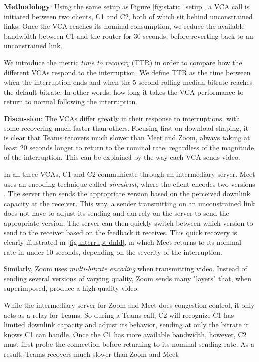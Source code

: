\noindent \textbf{Methodology}:
Using the same setup as Figure \ref{fig:static_setup}, a VCA call is initiated between two clients, C1 and C2, both of which sit behind unconstrained links. Once the VCA reaches its nominal consumption, we reduce the available bandwidth between C1 and the router for 30 seconds, before reverting back to an unconstrained link.  

We introduce the metric \textit{time to recovery} (TTR) in order to compare how the different VCAs respond to the interruption. We define TTR as the time 
between when the interruption ends and when the 5 second rolling median bitrate reaches the default bitrate. In other words, how long it takes the VCA performance to return to normal following the interruption.

\noindent \textbf{Discussion}: 
The VCAs differ greatly in their response to interruptions, with some recovering much faster than others. Focusing first on download shaping, it is clear that Teams recovers much slower than Meet and Zoom, always taking at least 20 seconds longer to return to the nominal rate, regardless of the magnitude of the interruption. This can be explained by the way each VCA sends video. 

In all three VCAs, C1 and C2 communicate through an intermediary server. Meet uses an encoding technique called \textit{simulcast}, where the client encodes two versions . The server then sends the appropriate version based on the perceived downlink capacity at the receiver. This way, a sender transmitting on an unconstrained link does not have to adjust its sending and can rely on the server to send the appropriate version. The server can then quickly switch between which version to send to the receiver based on the feedback it receives. This quick recovery is clearly illustrated in \ref{fig:interrupt-dnld}, in which Meet returns to its nominal rate in under 10 seconds, depending on the severity of the interruption.

Similarly, Zoom uses \textit{multi-bitrate encoding} when transmitting video. Instead of sending several versions of varying quality, Zoom sends many "layers" that, when superimposed, produce a high quality video. 

While the intermediary server for Zoom and Meet does congestion control, it only acts as a relay for Teams. So during a Teams call, C2 will recognize C1 has limited downlink capacity and adjust its behavior, sending at only the bitrate it knows C1 can handle. Once the C1 has more available bandwidth, however, C2 must first probe the connection before returning to its nominal sending rate. As a result, Teams recovers much slower than Zoom and Meet.

